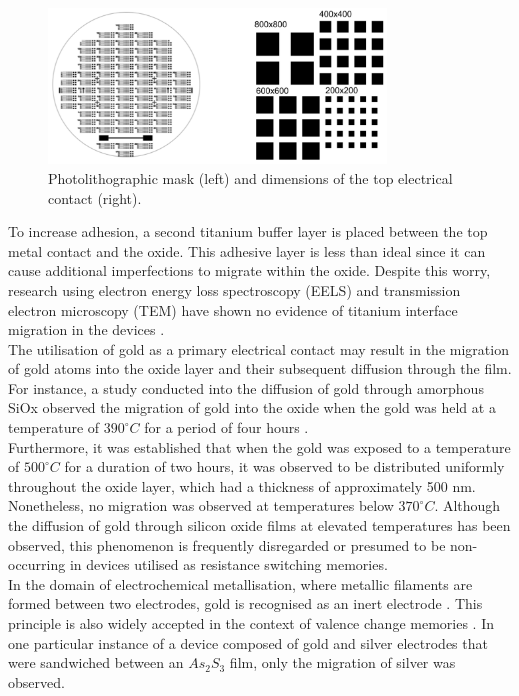 \begin{figure}[htbp!] 
    \centering    
    \includegraphics[width=0.8\textwidth]{Chapter3/Figs/a.png}
    \caption[Device Structure]{Photolithographic mask (left) and dimensions of the top electrical contact (right).}
    \label{fig:3a}
\end{figure}

\noindent To increase adhesion, a second titanium buffer layer is placed between the top metal contact and the oxide. This adhesive layer is less than ideal since it can cause additional imperfections to migrate within the oxide. Despite this worry, research using electron energy loss spectroscopy (EELS) and transmission electron microscopy (TEM) have shown no evidence of titanium interface migration in the devices \cite{mehonic2017intrinsic}. \\

\noindent The utilisation of gold as a primary electrical contact may result in the migration of gold atoms into the oxide layer and their subsequent diffusion through the film. For instance, a study conducted into the diffusion of gold through amorphous SiOx observed the migration of gold into the oxide when the gold was held at a temperature of $390^{\circ} C$ for a period of four hours \cite{madams1974migration}. \\

\noindent Furthermore, it was established that when the gold was exposed to a temperature of $500^{\circ} C$ for a duration of two hours, it was observed to be distributed uniformly throughout the oxide layer, which had a thickness of approximately 500 nm. Nonetheless, no migration was observed at temperatures below $370^{\circ} C$. Although the diffusion of gold through silicon oxide films at elevated temperatures has been observed, this phenomenon is frequently disregarded or presumed to be non-occurring in devices utilised as resistance switching memories. \\

\noindent In the domain of electrochemical metallisation, where metallic filaments are formed between two electrodes, gold is recognised as an inert electrode \cite{kozicki2016electrochemical}. This principle is also widely accepted in the context of valence change memories \cite{ge2014electrode}. In one particular instance of a device composed of gold and silver electrodes that were sandwiched between an $As_2S_3$ film, only the migration of silver was observed. \\

